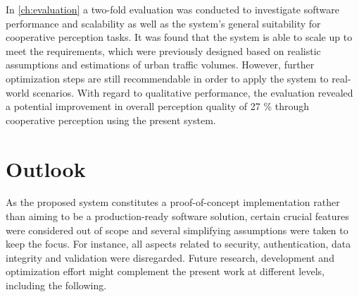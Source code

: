 In \cref{ch:evaluation} a two-fold evaluation was conducted to investigate software performance and scalability as well as the system's general suitability for cooperative perception tasks. It was found that the system is able to scale up to meet the requirements, which were previously designed based on realistic assumptions and estimations of urban traffic volumes. However, further optimization steps are still recommendable in order to apply the system to real-world scenarios. With regard to qualitative performance, the evaluation revealed a potential improvement in overall perception quality of 27 \% through cooperative perception using the present system. 

\section{Outlook}
\label{sec:conclusion:outlook}
As the proposed system constitutes a proof-of-concept implementation rather than aiming to be a production-ready software solution, certain crucial features were considered out of scope and several simplifying assumptions were taken to keep the focus. For instance, all aspects related to security, authentication, data integrity and validation were disregarded. Future research, development and optimization effort might complement the present work at different levels, including the following. 


